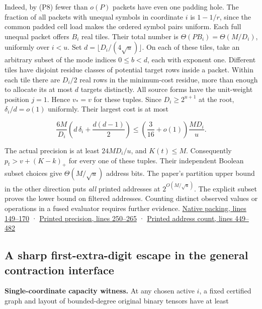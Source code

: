 \documentclass[
  11pt,
]{article}
\begin{document}
Indeed, by (P8) fewer than \(o(P)\) packets have even one padding hole.
The fraction of all packets with unequal symbols in coordinate \(i\) is
\(1-1/r\), since the common padded cell load makes the ordered symbol
pairs uniform. Each full unequal packet offers \(B_i\) real tiles. Their
total number is \(\Theta(PB_i)=\Theta(M/D_i)\), uniformly over \(i<u\).
Set \(d=\lfloor D_i/(4\sqrt u)\rfloor\). On each of these tiles, take an
arbitrary subset of the mode indices \(0\le b<d\), each with exponent
one. Different tiles have disjoint residue classes of potential target
rows inside a packet. Within each tile there are \(D_i/2\) real rows in
the minimum-cost residue, more than enough to allocate its at most \(d\)
targets distinctly. All source forms have the unit-weight position
\(j=1\). Hence \(v_*=v\) for these tuples. Since \(D_i\ge2^{u+1}\) at
the root, \(\delta_i/d=o(1)\) uniformly. Their largest cost is at most

\[
 \frac{6M}{D_i}\left(d\,\delta_i+\frac{d(d-1)}2\right)
 \le \left(\frac{3}{16}+o(1)\right)\frac{MD_i}{u}.
\]

The actual precision is at least \(24 MD_i/u\), and \(K(t)\le M\).
Consequently \(p_t>v+(K-k)_+\) for every one of these tuples. Their
independent Boolean subset choices give \(\Theta(M/\sqrt u)\) address
bits. The paper's partition upper bound in the other direction puts
\emph{all} printed addresses at \(2^{O(M/\sqrt u)}\). The explicit
subset proves the lower bound on filtered addresses. Counting distinct
observed values or operations in a fused evaluator requires further
evidence.
\href{https://github.com/openai/math/blob/main/preprints/The-Exponential-Time-Hypothesis-is-False-October-25-2026/build/quantitative-contraction.tex\#L149}{Native
packing, lines 149--170} ·
\href{https://github.com/openai/math/blob/main/preprints/The-Exponential-Time-Hypothesis-is-False-October-25-2026/build/quantitative-contraction.tex\#L250}{Printed
precision, lines 250--265} ·
\href{https://github.com/openai/math/blob/main/preprints/The-Exponential-Time-Hypothesis-is-False-October-25-2026/build/quantitative-contraction.tex\#L449}{Printed
address count, lines 449--482}

\subsection{A sharp first-extra-digit escape in the general contraction
interface}\label{v9-a-sharp-first-extra-digit-escape-in-the-general-contraction-interface}

\textbf{Single-coordinate capacity witness.} At any chosen active \(i\),
a fixed certified graph and layout of bounded-degree original binary
tensors have at least
\end{document}
